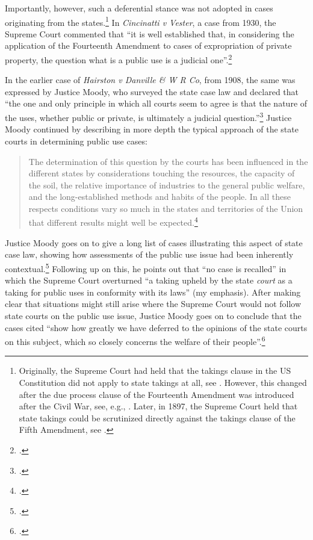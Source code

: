 Importantly, however, such a deferential stance was not adopted in cases originating from the states.\footnote{Originally, the Supreme Court had held that the takings clause in the US Constitution did not apply to state takings at all, see \cite{barron33}. However, this changed after the due process clause of the Fourteenth Amendment was introduced after the Civil War, see, e.g., \cite{head85}. Later, in 1897, the Supreme Court held that state takings could be scrutinized directly against the takings clause of the Fifth Amendment, see \cite{chicago97}.} In {\it Cincinatti v Vester}, a case from 1930, the Supreme Court commented that ``it is well established that, in considering the application of the Fourteenth Amendment to cases of expropriation of private property, the question what is a public use is a judicial one''.\footcite[447]{vester30}

In the earlier case of {\it Hairston v Danville \& W R Co}, from 1908, the same was expressed by Justice Moody, who surveyed the state case law and declared that ``the one and only principle in which all courts seem to agree is that the nature of the uses, whether public or private, is ultimately a judicial question.''\footcite[606]{hairston08} Justice Moody continued by describing in more depth the typical approach of the state courts in determining public use cases:

\begin{quote}
The determination of this question by the courts has been influenced in the different states by considerations touching the resources, the capacity of the soil, the relative importance of industries to the general public welfare, and the long-established methods and habits of the people. In all these respects conditions vary so much in the states and territories of the Union that different results might well be expected.\footcite[606]{hairston08}
\end{quote}

Justice Moody goes on to give a long list of cases illustrating this aspect of state case law, showing how assessments of the public use issue had been inherently contextual.\footcite[607]{hairston08} Following up on this, he points out that ``no case is recalled'' in which the Supreme Court overturned ``a taking upheld by the state {\it court} as a taking for public uses in conformity with its laws'' (my emphasis). After making clear that situations might still arise where the Supreme Court would not follow state courts on the public use issue, Justice Moody goes on to conclude that the cases cited ``show how greatly we have deferred to the opinions of the state courts on this subject, which so closely concerns the welfare of their people''.\footcite[606]{hairston08}

